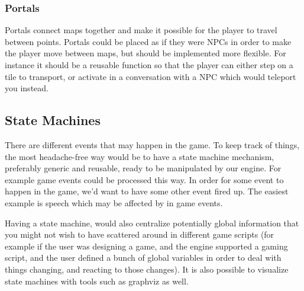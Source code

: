 \subsubsection{Portals}

Portals connect maps together and make it possible for the player to travel
between points. Portals could be placed as if they were NPCs in order to make
the player move between maps, but should be implemented more flexible. For
instance it should be a reusable function so that the player can either step
on a tile to transport, or activate in a conversation with a NPC which would
teleport you instead.

\subsection{State Machines}

There are different events that may happen in the game. To keep track of
things, the most headache-free way would be to have a state machine mechanism,
preferably generic and reusable, ready to be manipulated by our engine. For
example game events could be processed this way. In order for some event to
happen in the game, we'd want to have some other event fired up. The easiest
example is speech which may be affected by in game events.

Having a state machine, would also centralize potentially global information
that you might not wish to have scattered around in different game scripts (for
example if the user was designing a game, and the engine supported a gaming
script, and the user defined a bunch of global variables in order to deal with
things changing, and reacting to those changes). It is also possible to visualize
state machines with tools such as graphviz as well.
